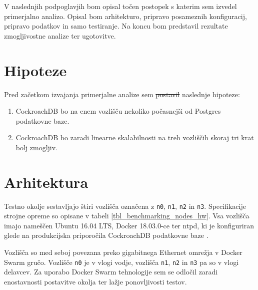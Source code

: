 \documentclass[a4paper, 12pt]{book}
\providecommand{\DIFaddtex}[1]{{\protect\color{blue}\uwave{#1}}} %
\providecommand{\DIFdeltex}[1]{{\protect\color{red}\sout{#1}}}                      %
\providecommand{\DIFaddbegin}{} %
\providecommand{\DIFaddend}{} %
\providecommand{\DIFdelbegin}{} %
\providecommand{\DIFdelend}{} %
\providecommand{\DIFadd}[1]{\texorpdfstring{\DIFaddtex{#1}}{#1}} %
\providecommand{\DIFdel}[1]{\texorpdfstring{\DIFdeltex{#1}}{}} %
\newcommand{\DIFscaledelfig}{0.5}
\newlength{\DIFdelgraphicswidth} %
\newlength{\DIFdelgraphicsheight} %
\newcommand{\DIFaddincludegraphics}[2][]{{\color{blue}\fbox{\DIFOincludegraphics[#1]{#2}}}} %
\newcommand{\DIFdelincludegraphics}[2][]{%
\sbox{\DIFdelgraphicsbox}{\DIFOincludegraphics[#1]{#2}}%
\settoboxwidth{\DIFdelgraphicswidth}{\DIFdelgraphicsbox} %
\settoboxtotalheight{\DIFdelgraphicsheight}{\DIFdelgraphicsbox} %
\scalebox{\DIFscaledelfig}{%
\parbox[b]{\DIFdelgraphicswidth}{\usebox{\DIFdelgraphicsbox}\\[-\baselineskip] \rule{\DIFdelgraphicswidth}{0em}}\llap{\resizebox{\DIFdelgraphicswidth}{\DIFdelgraphicsheight}{%
\setlength{\unitlength}{\DIFdelgraphicswidth}%
\begin{picture}(1,1)%
\thicklines\linethickness{2pt} %
{\color[rgb]{1,0,0}\put(0,0){\framebox(1,1){}}}%
{\color[rgb]{1,0,0}\put(0,0){\line( 1,1){1}}}%
{\color[rgb]{1,0,0}\put(0,1){\line(1,-1){1}}}%
\end{picture}%
}\hspace*{3pt}}} %
} %
\DeclareRobustCommand{\DIFaddbegin}{\DIFOaddbegin \let\includegraphics\DIFaddincludegraphics} %
\DeclareRobustCommand{\DIFaddend}{\DIFOaddend \let\includegraphics\DIFOincludegraphics} %
\DeclareRobustCommand{\DIFdelbegin}{\DIFOdelbegin \let\includegraphics\DIFdelincludegraphics} %
\DeclareRobustCommand{\DIFdelend}{\DIFOaddend \let\includegraphics\DIFOincludegraphics} %
\begin{document}
\DIFaddend V naslednjih podpoglavjih bom opisal točen postopek s katerim sem izvedel primerjalno analizo. Opisal bom arhitekturo, pripravo posameznih konfiguracij, pripravo podatkov in samo testiranje. Na koncu bom predstavil rezultate zmogljivostne analize ter ugotovitve.
\DIFdelbegin %
\DIFdelend 

\section{Hipoteze}
Pred začetkom izvajanja primerjalne analize sem \DIFdelbegin \DIFdel{postavil }\DIFdelend \DIFaddbegin \DIFadd{postavill }\DIFaddend naslednje hipoteze:
\begin{enumerate}
    \item CockroachDB bo na enem vozlišču nekoliko počasnejši od Postgres podatkovne baze.

    \item CockroachDB bo zaradi linearne skalabilnosti na treh vozliščih skoraj tri krat bolj zmogljiv.
\end{enumerate}

\section{Arhitektura}
Testno okolje sestavljajo štiri vozlišča označena z \texttt{n0}, \texttt{n1}, \texttt{n2} in \texttt{n3}. Specifikacije strojne opreme so opisane v tabeli \ref{tbl_benchmarking_nodes_hw}. Vsa vozlišča imajo nameščen Ubuntu 16.04 LTS, Docker 18.03.0-ce ter ntpd, ki je konfiguriran glede na produkcijska priporočila  CockroachDB podatkovne baze \cite{CRDB-ntpd-configuration}.

Vozlišča so med seboj povezana preko gigabitnega Ethernet omrežja v Docker Swarm \cite{Docker-Swarm-Mode} gručo. Vozlišče \texttt{n0} je v vlogi vodje, vozlišča \texttt{n1}, \texttt{n2} in \texttt{n3} pa so v vlogi delavcev. Za uporabo Docker Swarm tehnologije sem se odločil zaradi enostavnosti postavitve okolja ter lažje ponovljivosti testov.
\end{document}

